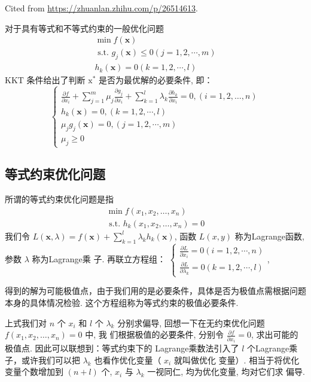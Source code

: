 Cited from \url{https://zhuanlan.zhihu.com/p/26514613}.

对于具有等式和不等式约束的一般优化问题
$$
\begin{array}{l}
\min f(\mathbf{x}) \\
\text { s.t. } g_{j}(\mathbf{x}) \leq 0(j=1,2, \cdots, m) \\
h_{k}(\mathbf{x})=0(k=1,2, \cdots, l)
\end{array}
$$
$ \mathrm{KKT} $ 条件给出了判断 $ \mathrm{x}^{*} $ 是否为最优解的必要条件, 即：
$$
\left\{\begin{array}{l}
\frac{\partial f}{\partial x_{i}}+\sum_{j=1}^{m} \mu_{j} \frac{\partial g_{j}}{\partial x_{i}}+\sum_{k=1}^{l} \lambda_{k} \frac{\partial h_{k}}{\partial x_{i}}=0,(i=1,2, \ldots, n) \\
h_{k}(\mathbf{x})=0,(k=1,2, \cdots, l) \\
\mu_{j} g_{j}(\mathbf{x})=0,(j=1,2, \cdots, m) \\
\mu_{j} \geq 0
\end{array}\right.
$$

\subsection{等式约束优化问题}

所谓的等式约束优化问题是指
$$
\begin{array}{l}
\min f\left(x_{1}, x_{2}, \ldots, x_{n}\right) \\
\text { s.t. } h_{k}\left(x_{1}, x_{2}, \ldots, x_{n}\right)=0
\end{array}
$$
我们令 $ L(\mathbf{x}, \lambda)=f(\mathbf{x})+\sum_{k=1}^{l} \lambda_{k} h_{k}(\mathbf{x}) $, 函数 $ L(x, y) $ 称为Lagrange函数, 参数 $ \lambda $ 称为Lagrange乘 子.
再联立方程组： $ \left\{\begin{array}{l}\frac{\partial L}{\partial x_{i}}=0(i=1,2, \cdots, n) \\ \frac{\partial L}{\partial \lambda_{k}}=0(k=1,2, \cdots, l)\end{array}\right. $,

得到的解为可能极值点，由于我们用的是必要条件，具体是否为极值点需根据问题本身的具体情况检验. 这个方程组称为等式约束的极值必要条件.

上式我们对 $ n $ 个 $ x_{i} $ 和 $ l $ 个 $ \lambda_{k} $ 分别求偏导, 回想一下在无约束优化问题 $ f\left(x_{1}, x_{2}, \ldots, x_{n}\right)=0 $ 中, 我 们根据极值的必要条件, 分别令 $ \frac{\partial f}{\partial x_{i}}=0 $, 求出可能的极值点. 因此可以联想到：等式约束下的 Lagrange乘数法引入了 $ l $ 个Lagrange乘子，或许我们可以把 $ \lambda_{k} $ 也看作优化变量（ $ x_{i} $ 就叫做优化 变量）. 相当于将优化变量个数增加到 $ (n+l) $ 个, $ x_{i} $ 与 $ \lambda_{k} $ 一视同仁, 均为优化变量, 均对它们求 偏导.

